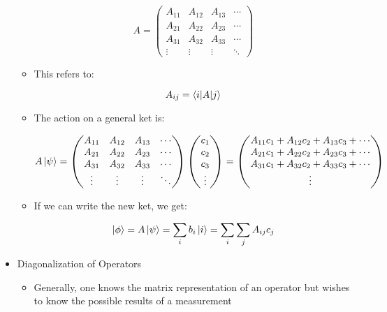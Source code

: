 \begin{itemize}
\begin{itemize}
        $$A=\left( \begin{matrix} A_{11} & A_{12} & A_{13} & \cdots\\ A_{21} & A_{22} & A_{23} & \cdots\\ A_{31} & A_{32} & A_{33} & \cdots\\ \vdots & \vdots & \vdots & \ddots \end{matrix} \right)$$

      \item This refers to:

        $$A_{ij}=\bra{i | A}\ket{j}$$

      \item The action on a general ket is:

        $$A\ket{\psi}=\left( \begin{matrix} A_{11} & A_{12} & A_{13} & \cdots\\ A_{21} & A_{22} & A_{23} & \cdots\\ A_{31} & A_{32} & A_{33} & \cdots\\ \vdots & \vdots & \vdots & \ddots \end{matrix} \right)\left( \begin{matrix} c_1\\c_2\\c_3\\\vdots\end{matrix} \right)=\left( \begin{matrix} A_{11}c_1+A_{12}c_2+A_{13}c_3+\cdots\\A_{21}c_1+A_{22}c_2+A_{23}c_3+\cdots\\A_{31}c_1+A_{32}c_2+A_{33}c_3+\cdots\\\vdots\end{matrix} \right)$$

      \item If we can write the new ket, we get:

        $$\ket{\phi}=A\ket{\psi}=\sum_i b_i\ket{i}=\sum_i\sum_j A_{ij}c_j$$

    \end{itemize}

  \item Diagonalization of Operators

    \begin{itemize}

      \item Generally, one knows the matrix representation of an operator but wishes to know the possible results of a measurement


\end{itemize}
\end{itemize}
